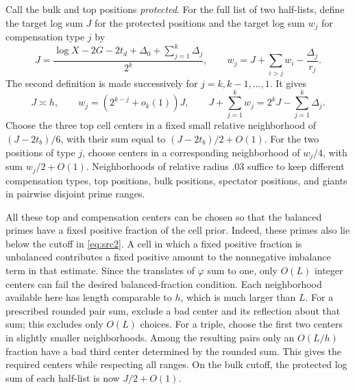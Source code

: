 Call the bulk and top positions \emph{protected}.  For the full list
of two half-lists, define the target log sum $J$ for the protected
positions and the target log sum $w_j$ for compensation type $j$ by
\begin{equation}
 J=\frac{\log X-2G-2t_d+\Delta_0+\sum_{j=1}^k\Delta_j}{2^k},
 \qquad
 w_j=J+\sum_{i>j}w_i-\frac{\Delta_j}{r_j}.
 \label{eq:src45}
\end{equation}
The second definition is made successively for $j=k,k-1,\ldots,1$.
It gives
\[
 J\asymp h,\qquad
 w_j=(2^{k-j}+o_k(1))J,
 \qquad
 J+\sum_{j=1}^kw_j=2^kJ-\sum_{j=1}^k\Delta_j.
\]
Choose the three top cell centers in a fixed small relative neighborhood of
$(J-2t_b)/6$, with their sum equal to $(J-2t_b)/2+O(1)$.
For the two positions of type $j$, choose centers in a corresponding
neighborhood of $w_j/4$, with sum $w_j/2+O(1)$.  Neighborhoods of
relative radius $.03$ suffice to keep different compensation types,
top positions, bulk positions, spectator positions, and giants in
pairwise disjoint prime ranges.

All these top and compensation centers can be chosen so that the
balanced primes have a fixed positive fraction of the cell prior.
Indeed, these primes also lie below the cutoff in
\eqref{eq:src2}.  A cell in which a fixed positive fraction is
unbalanced contributes a fixed positive amount to the nonnegative
imbalance term in that estimate.  Since the translates of
$\varphi$ sum to one, only $O(L)$ integer centers can fail the desired
balanced-fraction condition.  Each neighborhood available here has
length comparable to $h$, which is much larger than $L$.
For a prescribed rounded pair sum, exclude a bad center and its
reflection about that sum; this excludes only $O(L)$ choices.
For a triple, choose the first two centers in slightly smaller
neighborhoods.  Among the resulting pairs only an $O(L/h)$ fraction
have a bad third center determined by the rounded sum.  This gives
the required centers while respecting all ranges.  On the bulk
cutoff, the protected log sum of each half-list is now
$J/2+O(1)$.


